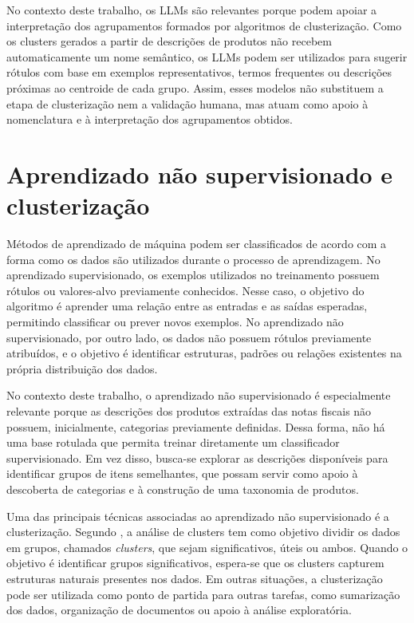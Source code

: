 \documentclass[english,brazilian]{UNISINOSmonografia}
\begin{document}
No contexto deste trabalho, os LLMs são relevantes porque podem apoiar a interpretação dos agrupamentos formados por algoritmos de clusterização. Como os clusters gerados a partir de descrições de produtos não recebem automaticamente um nome semântico, os LLMs podem ser utilizados para sugerir rótulos com base em exemplos representativos, termos frequentes ou descrições próximas ao centroide de cada grupo. Assim, esses modelos não substituem a etapa de clusterização nem a validação humana, mas atuam como apoio à nomenclatura e à interpretação dos agrupamentos obtidos.











\section{Aprendizado não supervisionado e clusterização}

Métodos de aprendizado de máquina podem ser classificados de acordo com a forma como os dados são utilizados durante o processo de aprendizagem. No aprendizado supervisionado, os exemplos utilizados no treinamento possuem rótulos ou valores-alvo previamente conhecidos. Nesse caso, o objetivo do algoritmo é aprender uma relação entre as entradas e as saídas esperadas, permitindo classificar ou prever novos exemplos. No aprendizado não supervisionado, por outro lado, os dados não possuem rótulos previamente atribuídos, e o objetivo é identificar estruturas, padrões ou relações existentes na própria distribuição dos dados.

No contexto deste trabalho, o aprendizado não supervisionado é especialmente relevante porque as descrições dos produtos extraídas das notas fiscais não possuem, inicialmente, categorias previamente definidas. Dessa forma, não há uma base rotulada que permita treinar diretamente um classificador supervisionado. Em vez disso, busca-se explorar as descrições disponíveis para identificar grupos de itens semelhantes, que possam servir como apoio à descoberta de categorias e à construção de uma taxonomia de produtos.

Uma das principais técnicas associadas ao aprendizado não supervisionado é a clusterização. Segundo \cite{tan2005introduction}, a análise de clusters tem como objetivo dividir os dados em grupos, chamados \textit{clusters}, que sejam significativos, úteis ou ambos. Quando o objetivo é identificar grupos significativos, espera-se que os clusters capturem estruturas naturais presentes nos dados. Em outras situações, a clusterização pode ser utilizada como ponto de partida para outras tarefas, como sumarização dos dados, organização de documentos ou apoio à análise exploratória.
\end{document}
